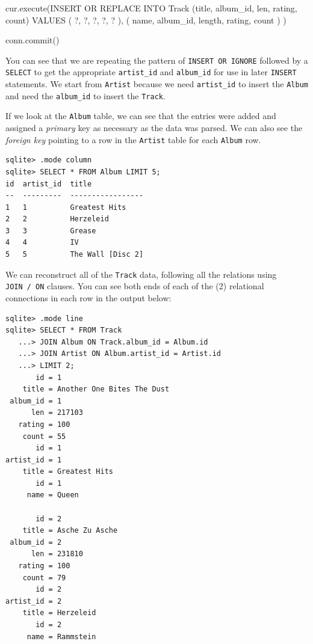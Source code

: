 \documentclass[10pt,]{book}
\newenvironment{Shaded}{}{}
\newcommand{\NormalTok}[1]{#1}
\newcommand{\StringTok}[1]{\textcolor[rgb]{0.25,0.44,0.63}{#1}}
\begin{document}
\begin{Shaded}
\begin{Highlighting}[]
\NormalTok{    cur.execute(}\StringTok{\textquotesingle{}\textquotesingle{}\textquotesingle{}INSERT OR REPLACE INTO Track}
\StringTok{        (title, album\_id, len, rating, count)}
\StringTok{        VALUES ( ?, ?, ?, ?, ? )\textquotesingle{}\textquotesingle{}\textquotesingle{}}\NormalTok{,}
\NormalTok{        ( name, album\_id, length, rating, count ) )}

\NormalTok{    conn.commit()}
\end{Highlighting}
\end{Shaded}

You can see that we are repeating the pattern of
\texttt{INSERT\ OR\ IGNORE} followed by a \texttt{SELECT} to get the
appropriate \texttt{artist\_id} and \texttt{album\_id} for use in later
\texttt{INSERT} statements. We start from \texttt{Artist} because we
need \texttt{artist\_id} to insert the \texttt{Album} and need the
\texttt{album\_id} to insert the \texttt{Track}.

  If we look at the \texttt{Album}
table, we can see that the entries were added and assigned a
\emph{primary} key as necessary as the data was parsed. We can also see
the \emph{foreign key} pointing to a row in the \texttt{Artist} table
for each \texttt{Album} row.

{\small
\begin{verbatim}
sqlite> .mode column
sqlite> SELECT * FROM Album LIMIT 5;
id  artist_id  title 
--  ---------  -----------------
1   1          Greatest Hits    
2   2          Herzeleid        
3   3          Grease           
4   4          IV               
5   5          The Wall [Disc 2]
\end{verbatim}
}

  We can reconstruct all of the
\texttt{Track} data, following all the relations using
\texttt{JOIN\ /\ ON} clauses. You can see both ends of each of the (2)
relational connections in each row in the output below:

{\small
\begin{verbatim}
sqlite> .mode line
sqlite> SELECT * FROM Track
   ...> JOIN Album ON Track.album_id = Album.id
   ...> JOIN Artist ON Album.artist_id = Artist.id
   ...> LIMIT 2;
       id = 1
    title = Another One Bites The Dust
 album_id = 1
      len = 217103
   rating = 100
    count = 55
       id = 1
artist_id = 1
    title = Greatest Hits
       id = 1
     name = Queen

       id = 2
    title = Asche Zu Asche
 album_id = 2
      len = 231810
   rating = 100
    count = 79
       id = 2
artist_id = 2
    title = Herzeleid
       id = 2
     name = Rammstein
\end{verbatim}
}
\end{document}
